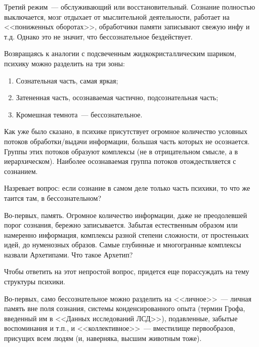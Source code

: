 \documentclass[a5paper,12pt,twoside]{memoir}
\begin{document}
Третий режим~--- обслуживающий или восстановительный. Сознание полностью выключается, мозг отдыхает от мыслительной деятельности, работает на <<пониженных оборотах>>, обработчики памяти записывают свежую инфу и т.д. Однако это не значит, что бессознательное бездействует.

Возвращаясь к аналогии с подсвеченным жидкокристаллическим шариком, психику можно разделить на три зоны:

\begin{enumerate}
\item Сознательная часть, самая яркая;
\item Затененная часть, осознаваемая частично, подсознательная часть;
\item Кромешная темнота~--- бессознательное.
\end{enumerate}

Как уже было сказано, в психике присутствует огромное количество условных потоков об\-ра\-бот\-ки/вы\-да\-чи информации, большая часть которых не осознается. Группы этих потоков образуют комплексы (не в отрицательном смысле, а в иерархическом). Наиболее осознаваемая группа потоков отождествляется с сознанием.

Назревает вопрос: если сознание в самом деле только часть психики, то что же таится там, в бессознательном?

Во-первых, память. Огромное количество информации, даже не преодолевшей порог сознания, бережно записывается. Забытая естественным образом или намеренно информация, комплексы разной степени сложности, от простеньких идей, до нуменозных образов. Самые глубинные и многогранные комплексы назвали Архетипами. Что такое Архетип?

Чтобы ответить на этот непростой вопрос, придется еще порассуждать на тему структуры психики.

Во-первых, само бессознательное можно разделить на <<личное>>~--- личная память вне поля сознания, системы конденсированного опыта (термин Грофа, введенный им в <<Данных исследований ЛСД>>), подавленные, забытые воспоминания и т.п., и <<коллективное>>~--- вместилище первообразов, присущих всем людям (и, наверняка, высшим животным тоже).
\end{document}
